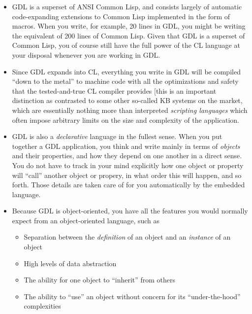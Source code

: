\documentclass [11pt]{book}
\begin{document}
\begin{itemize}

\item GDL is a superset of ANSI Common Lisp, and consists largely of
automatic code-expanding extensions to Common Lisp implemented in the
form of macros. When you write, for example, 20 lines in GDL, you
might be writing the equivalent of 200 lines of Common Lisp. Given
that GDL is a superset of Common Lisp, you of course still have the
full power of the CL language at your disposal whenever you are
working in GDL.
\item Since GDL expands into CL, everything you write in GDL will be
compiled ``down to the metal'' to machine code with all the
optimizations and safety that the tested-and-true CL compiler provides
[this is an important distinction as contrasted to some other
so-called KB systems on the market, which are essentially nothing more
than interpreted \emph{scripting languages} which often impose arbitrary limits on
the size and complexity of the application.

\item GDL is also a \emph{declarative} language in the fullest sense. When you put together a
GDL application, you think and write mainly in terms of \emph{objects} and their properties, and how they depend on one another
in a direct sense. You do not have to track in your mind explicitly
how one object or property will ``call'' another object or propery, in
what order this will happen, and so forth. Those details are taken
care of for you automatically by the embedded language.

\item Because GDL is object-oriented, you have all the features you would normally expect
from an object-oriented language, such as 

\begin{itemize}

\item Separation between the \emph{definition} of an object and an \emph{instance} of an object

\item High levels of data abstraction

\item The ability for one object to ``inherit'' from others

\item The ability to ``use'' an object without concern for
	its ``under-the-hood'' complexities


\end{itemize}
\end{itemize}
\end{document}
